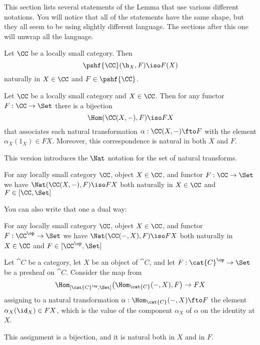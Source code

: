 This section lists several statements of the Lemma that use various different notations.
You will notice that all of the statements have the same shape, but they all seem to be
using slightly different language. The sections after this one will unwrap all the
language.

\begin{lemma}[Yoneda]   
\label{yoneda1}
Let $\CC$ be a locally small category.  Then
%
\begin{equation}        
\label{eq:yoneda}
\pshf{\CC}(\h_X, F)
\iso
F(X)
\end{equation}
%
naturally in $X \in \CC$ and $F \in \pshf{\CC}$.  
\end{lemma}

\begin{lemma}[Yoneda]\label{yoneda2} Let $\CC$ be a locally small category and $X \in
\CC$. Then for any functor $F : \CC \to \Set$ there is a bijection
$$
\Hom(\CC(X,-), F) \iso FX
$$
that associates each natural transformation $\alpha:\CC(X,-) \fto F$ with the element
$\alpha_X(1_X) \in FX$. Moreover, this correspondence is natural in both $X$ and $F$.
\end{lemma}

\noindent This version introduces the $\Nat$ notation for the set of natural transforms.

\begin{lemma}[Yoneda]\label{yoneda3} For any locally small category $\CC$, object $X \in
\CC$, and functor $F:\CC \to \Set$ we have  $\Nat(\CC(X,-),F) \iso FX$ both naturally in
$X \in \CC$ and $F \in [\CC, \Set]$
\end{lemma}

\noindent You can also write that one a dual way:

\begin{lemma}[Yoneda]\label{yoneda4} For any locally small category $\CC$, object $X \in
\CC$, and functor $F:\CC^{\op} \to \Set$ we have  $\Nat(\CC(-,X),F) \iso FX$ both
naturally in $X \in \CC$ and $F \in [\CC^{\op}, \Set]$
\end{lemma}

\begin{lemma}[Yoneda]\label{yoneda5} Let $\cat{C}$ be a category, let $X$ be an object of
 $\cat{C}$, and let $F:\cat{C}^\op\to\Set$ be a presheaf on $\cat{C}$. Consider the map
 from
 $$
 \Hom_{[\cat{C}^\op,\Set]} \bigl(\Hom_\cat{C} (-,X) , F \bigr) \to FX
 $$
 assigning to a natural transformation $\alpha:\Hom_\cat{C} (-,X)\fto F$ the element
 $\alpha_X(\id_X)\in FX$, which is the value of the component $\alpha_X$ of $\alpha$ on
 the identity at $X$. 

 This assignment is a bijection, and it is natural both in $X$ and in $F$.
\end{lemma}


